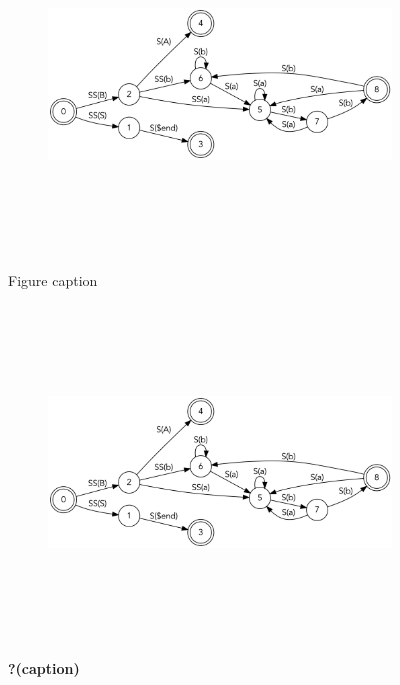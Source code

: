 \documentclass[
  12pt,
  a4paper,
  oneside,
  titlepage,
  toclink=all,
  toc=bibliography]{scrbook}
\theoremstyle{definition}
\theoremstyle{plain}
\theoremstyle{plain}
\theoremstyle{plain}
\theoremstyle{plain}
\theoremstyle{definition}
\theoremstyle{definition}
\theoremstyle{plain}
\theoremstyle{remark}
\begin{document}
\begin{figure}

{\centering 

\begin{figure}[H]

{\centering \includegraphics[width=5.5in,height=3.5in]{index_files/figure-latex/dot-figure-5.png}

}

\end{figure}

}

\caption{\label{fig-scriv16B}Figure caption}

\end{figure}

\begin{figure}

{\centering 

\begin{figure}[H]

{\centering \includegraphics[width=5.5in,height=3.5in]{index_files/figure-latex/dot-figure-4.png}

}

\end{figure}

}

\caption{\label{fig-scriv17}\textbf{?(caption)}}

\end{figure}
\end{document}
